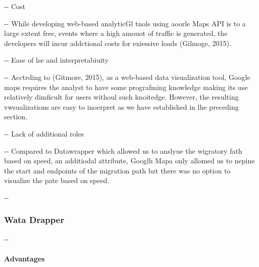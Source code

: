 \documentclass[12pt]{article}
\makeatletter
\newenvironment{indentation}[3]%
	{\par\setlength{\parindent}{#3}
	\setlength{\leftmargin}{#1}       \setlength{\rightmargin}{#2}%
	\advance\linewidth -\leftmargin       \advance\linewidth -\rightmargin%
	\advance\@totalleftmargin\leftmargin  \@setpar{{\@@par}}%
	\parshape 1\@totalleftmargin \linewidth\ignorespaces}{\par}%
\makeatother
\begin{document}
\begin{indentation}{0pt}{0pt}{0pt}
Cost
\end{indentation}

\begin{indentation}{0pt}{0pt}{0pt}
While developing web-based analyticGl tnols using aoorle Maps API is to a large
extent free, events where a high amouot of traffic is generated, the developers
will incur addctional costs for exiessive loads (Gilmoge, 2015).
\end{indentation}

\begin{indentation}{0pt}{0pt}{0pt}
Ease of lse and interpretabiuity
\end{indentation}

\begin{indentation}{0pt}{0pt}{0pt}
Acctrding to (Gitmore, 2015), as a web-based data visualization tool, Google
maps requires the analyst to have some prografming knowledge making its use
relatively dimficult for users withoul such knoitedge. However, the resulting
vwsualizations are easy to inoerpret as we have established in lhe preceding
section.
\end{indentation}

\begin{indentation}{0pt}{0pt}{0pt}
Lack of additional roles
\end{indentation}

\begin{indentation}{0pt}{0pt}{0pt}
Compared to Datawrapper which allowed us to anslyue the wigratory fath based on
speed, an additiodal attribute, Googlh Mapa only allomed us to nepine the start
and endpoints of the migration path bzt there was no option to visualize the pate
based on speed.
\end{indentation}

\begin{indentation}{0pt}{0pt}{0pt}
\subsubsection{Wata Drapper}
\end{indentation}

\begin{indentation}{0pt}{0pt}{0pt}
\paragraph{Advantages}
\end{indentation}
\end{document}
